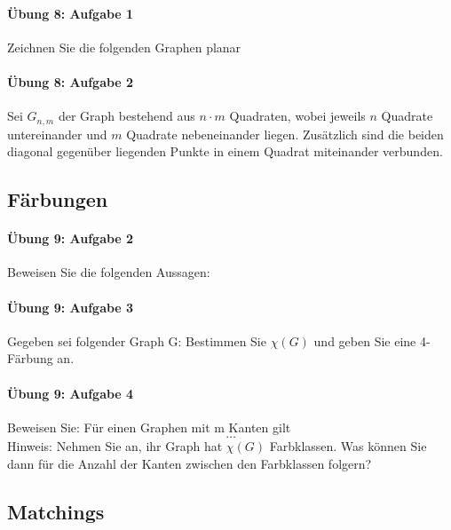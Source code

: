 \documentclass
[
  draft    = true,
  fontsize = 11pt,
  parskip  = half-,
  BCOR     = 0pt,
  DIV      = 11,
  ngerman,
  dvipsnames
]
{scrartcl}
\begin{document}
\paragraph{Übung 8: Aufgabe 1}
Zeichnen Sie die folgenden Graphen planar

\paragraph{Übung 8: Aufgabe 2}
Sei $G_{n,m}$ der Graph bestehend aus $n\cdot m$ Quadraten, wobei jeweils
$n$ Quadrate untereinander und $m$ Quadrate nebeneinander liegen.
Zusätzlich sind die beiden diagonal gegenüber liegenden Punkte in einem
Quadrat miteinander verbunden.

\subsection{Färbungen}

\paragraph{Übung 9: Aufgabe 2}
Beweisen Sie die folgenden Aussagen:

\paragraph{Übung 9: Aufgabe 3}
Gegeben sei folgender Graph G:
Bestimmen Sie $\chi(G)$ und geben Sie eine 4-Färbung an.

\paragraph{Übung 9: Aufgabe 4}
Beweisen Sie: Für einen Graphen mit m Kanten gilt
\begin{equation*}
  \ldots
\end{equation*}
Hinweis: Nehmen Sie an, ihr Graph hat $\chi(G)$ Farbklassen. Was können
Sie dann für die Anzahl der Kanten zwischen den Farbklassen folgern?

\subsection{Matchings}
\end{document}
